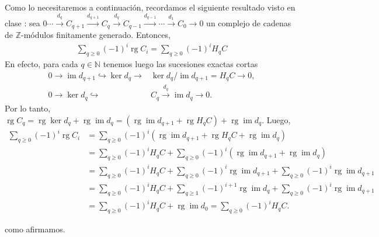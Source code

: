 \documentclass[11pt]{article}
\newcommand{\N}{\mathbb{N}}
\newcommand{\Z}{\mathbb{Z}}
\newcommand{\rg}{\operatorname{rg}}
\newcommand{\im}{\operatorname{im}}
\newcommand{\paint}[2]{\color{#1}{#2}}
\newenvironment{obs}[2][Observaci\'on]{\begin{trivlist}
\item[\hskip \labelsep \paint{orange}{{\bfseries #1}}\hskip \labelsep {\bfseries #2.}]}{\end{trivlist}}
\begin{document}
\begin{obs}{3} Como lo necesitaremos a continuaci\'on, recordamos el siguiente resultado visto en clase : sea $0 \cdots \xrightarrow{d_{q}} C_{q+1} \xrightarrow{d_{q+1}} C_q \xrightarrow{d_{q}} C_{q-1} \xrightarrow{d_{q-1}} \cdots \xrightarrow{d_{1}} C_0 \to 0$ un complejo de cadenas de $\Z$-m\'odulos finitamente generado. Entonces,
\begin{align*}
\sum_{q \geq 0}(-1)^i\rg C_i = \sum_{q \geq 0}(-1)^iH_qC
\end{align*}
En efecto, para cada $q \in \N$ tenemos luego las sucesiones exactas cortas
\begin{align*}
0 \to \im d_{q+1} \hookrightarrow \ker d_q \to &\ker d_q/\im d_{q+1} = H_qC \to 0, \\
0 \to \ker d_q \hookrightarrow &C_q \xrightarrow{d_q} \im d_q \to 0.
\end{align*}
Por lo tanto, $\rg C_q =  \rg \ker d_q + \rg \im d_q = (\rg \im d_{q+1} + \rg H_qC) + \rg \im d_q$. Luego,
\begin{align*}
\sum_{q \geq 0}(-1)^i\rg C_i &= \sum_{q \geq 0}(-1)^i(\rg \im d_{q+1} + \rg H_qC + \rg \im d_q)\\
&= \sum_{q \geq 0}(-1)^iH_qC + \sum_{q \geq 0}(-1)^i(\rg \im d_{q+1} + \rg \im d_q)\\
&= \sum_{q \geq 0}(-1)^iH_qC + \sum_{q \geq 0}(-1)^i\rg \im d_{q+1} + \sum_{q \geq 0}(-1)^i\rg \im d_{q+1}\\
&= \sum_{q \geq 0}(-1)^iH_qC + \sum_{q \geq 1}(-1)^{i+1}\rg \im d_{q} + \sum_{q \geq 0}(-1)^i\rg \im d_{q+1}\\
&= \sum_{q \geq 0}(-1)^iH_qC + \rg \im d_0 = \sum_{q \geq 0}(-1)^iH_qC.
\end{align*} 
\end{obs}
como afirmamos.
\end{document}
